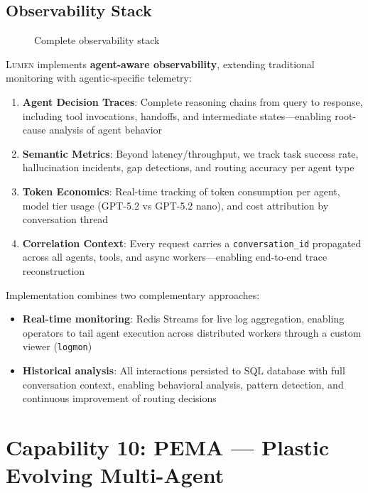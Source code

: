\documentclass[11pt,a4paper]{article}
\theoremstyle{definition}
\theoremstyle{remark}
\newcommand{\lumen}{\textsc{Lumen}\xspace}
\begin{document}
\subsection{Observability Stack}

\begin{figure}[H]
    \centering
    
    \caption{Complete observability stack}
    \label{fig:observability}
\end{figure}

\lumen implements \textbf{agent-aware observability}, extending traditional monitoring with agentic-specific telemetry:

\begin{enumerate}
    \item \textbf{Agent Decision Traces}: Complete reasoning chains from query to response, including tool invocations, handoffs, and intermediate states---enabling root-cause analysis of agent behavior

    \item \textbf{Semantic Metrics}: Beyond latency/throughput, we track task success rate, hallucination incidents, gap detections, and routing accuracy per agent type

    \item \textbf{Token Economics}: Real-time tracking of token consumption per agent, model tier usage (GPT-5.2 vs GPT-5.2 nano), and cost attribution by conversation thread

    \item \textbf{Correlation Context}: Every request carries a \texttt{conversation\_id} propagated across all agents, tools, and async workers---enabling end-to-end trace reconstruction
\end{enumerate}

Implementation combines two complementary approaches:
\begin{itemize}
    \item \textbf{Real-time monitoring}: Redis Streams for live log aggregation, enabling operators to tail agent execution across distributed workers through a custom viewer (\texttt{logmon})
    \item \textbf{Historical analysis}: All interactions persisted to SQL database with full conversation context, enabling behavioral analysis, pattern detection, and continuous improvement of routing decisions
\end{itemize}

\section{Capability 10: PEMA --- Plastic Evolving Multi-Agent}
\label{sec:pema}
\end{document}
